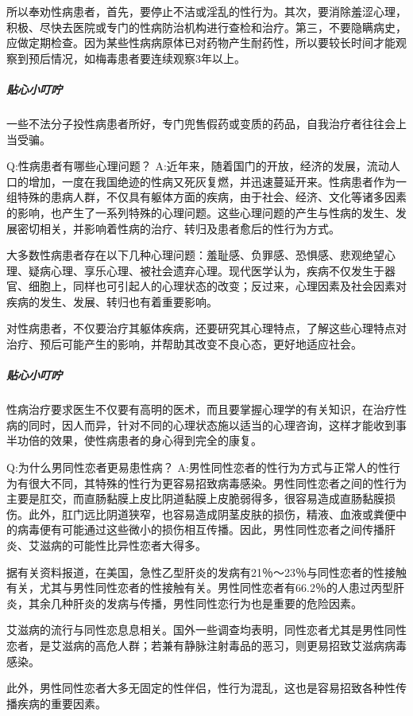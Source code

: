 \documentclass[12pt,UTF8]{ctexbook}
\begin{document}
所以奉劝性病患者，首先，要停止不洁或淫乱的性行为。其次，要消除羞涩心理，积极、尽快去医院或专门的性病防治机构进行查检和治疗。第三，不要隐瞒病史，应做定期检查。因为某些性病病原体已对药物产生耐药性，所以要较长时间才能观察到预后情况，如梅毒患者要连续观察3年以上。

\subparagraph{贴心小叮咛}

一些不法分子投性病患者所好，专门兜售假药或变质的药品，自我治疗者往往会上当受骗。

Q:性病患者有哪些心理问题？
A:近年来，随着国门的开放，经济的发展，流动人口的增加，一度在我国绝迹的性病又死灰复燃，并迅速蔓延开来。性病患者作为一组特殊的患病人群，不仅具有躯体方面的疾病，由于社会、经济、文化等诸多因素的影响，也产生了一系列特殊的心理问题。这些心理问题的产生与性病的发生、发展密切相关，并影响着性病的治疗、转归及患者愈后的性行为方式。

大多数性病患者存在以下几种心理问题：羞耻感、负罪感、恐惧感、悲观绝望心理、疑病心理、享乐心理、被社会遗弃心理。现代医学认为，疾病不仅发生于器官、细胞上，同样也可引起人的心理状态的改变；反过来，心理因素及社会因素对疾病的发生、发展、转归也有着重要影响。

对性病患者，不仅要治疗其躯体疾病，还要研究其心理特点，了解这些心理特点对治疗、预后可能产生的影响，并帮助其改变不良心态，更好地适应社会。

\subparagraph{贴心小叮咛}

性病治疗要求医生不仅要有高明的医术，而且要掌握心理学的有关知识，在治疗性病的同时，因人而异，针对不同的心理状态施以适当的心理咨询，这样才能收到事半功倍的效果，使性病患者的身心得到完全的康复。

Q:为什么男同性恋者更易患性病？
A:男性同性恋者的性行为方式与正常人的性行为有很大不同，其特殊的性行为更容易招致病毒感染。男性同性恋者之间的性行为主要是肛交，而直肠黏膜上皮比阴道黏膜上皮脆弱得多，很容易造成直肠黏膜损伤。此外，肛门远比阴道狭窄，也容易造成阴茎皮肤的损伤，精液、血液或粪便中的病毒便有可能通过这些微小的损伤相互传播。因此，男性同性恋者之间传播肝炎、艾滋病的可能性比异性恋者大得多。

据有关资料报道，在美国，急性乙型肝炎的发病有21％～23％与同性恋者的性接触有关，尤其与男性同性恋者的性接触有关。男性同性恋者有66.2％的人患过丙型肝炎，其余几种肝炎的发病与传播，男性同性恋行为也是重要的危险因素。

艾滋病的流行与同性恋息息相关。国外一些调查均表明，同性恋者尤其是男性同性恋者，是艾滋病的高危人群；若兼有静脉注射毒品的恶习，则更易招致艾滋病病毒感染。

此外，男性同性恋者大多无固定的性伴侣，性行为混乱，这也是容易招致各种性传播疾病的重要因素。
\end{document}

